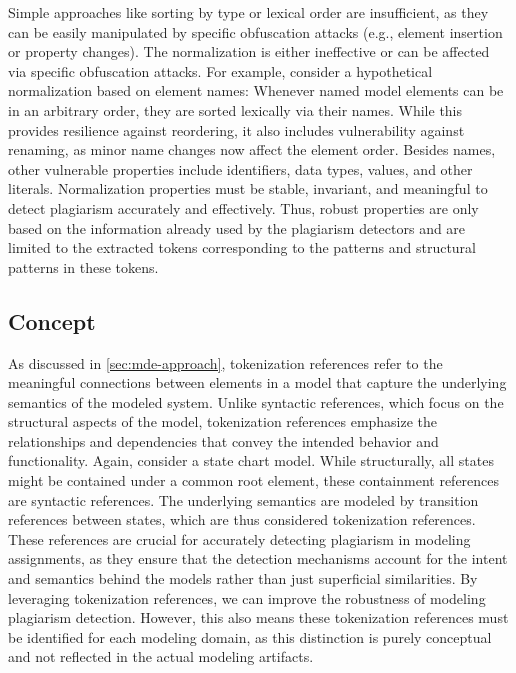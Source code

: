 Simple approaches like sorting by type or lexical order are insufficient, as they can be easily manipulated by specific obfuscation attacks (e.g., element insertion or property changes). The normalization is either ineffective or can be affected via specific obfuscation attacks.
For example, consider a hypothetical normalization based on element names: Whenever named model elements can be in an arbitrary order, they are sorted lexically via their names. While this provides resilience against reordering, it also includes vulnerability against renaming, as minor name changes now affect the element order. Besides names, other vulnerable properties include identifiers, data types, values, and other literals.
Normalization properties must be stable, invariant, and meaningful to detect plagiarism accurately and effectively.
Thus, robust properties are only based on the information already used by the plagiarism detectors and are limited to the extracted tokens corresponding to the patterns and structural patterns in these tokens.


\subsection{Concept}
As discussed in \autoref{sec:mde-approach}, tokenization references refer to the meaningful connections between elements in a model that capture the underlying semantics of the modeled system. Unlike syntactic references, which focus on the structural aspects of the model, tokenization references emphasize the relationships and dependencies that convey the intended behavior and functionality. 
Again, consider a state chart model. While structurally, all states might be contained under a common root element, these containment references are syntactic references. The underlying semantics are modeled by transition references between states, which are thus considered tokenization references.
These references are crucial for accurately detecting plagiarism in modeling assignments, as they ensure that the detection mechanisms account for the intent and semantics behind the models rather than just superficial similarities. By leveraging tokenization references, we can improve the robustness of modeling plagiarism detection. However, this also means these tokenization references must be identified for each modeling domain, as this distinction is purely conceptual and not reflected in the actual modeling artifacts.

